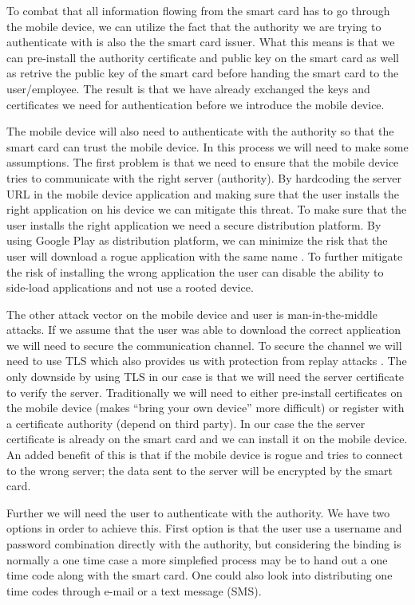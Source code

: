 To combat that all information flowing from the smart card has to go through the mobile device, we can utilize the fact that the authority we are trying to authenticate with is also the the smart card issuer. What this means is that we can pre-install the authority certificate and public key on the smart card as well as retrive the public key of the smart card before handing the smart card to the user/employee. The result is that we have already exchanged the keys and certificates we need for authentication before we introduce the mobile device.

The mobile device will also need to authenticate with the authority so that the smart card can trust the mobile device. In this process we will need to make some assumptions. The first problem is that we need to  ensure that the mobile device tries to communicate with the right server (authority). By hardcoding the server URL in the mobile device application and making sure that the user installs the right application on his device we can mitigate this threat. To make sure that the user installs the right application we need a secure distribution platform. By using Google Play as distribution platform, we can minimize the risk that the user will download a rogue application with the same name \cite{googlePlaySecureDist}. To further mitigate the risk of installing the wrong application the user can disable the ability to side-load applications and not use a rooted device.

The other attack vector on the mobile device and user is man-in-the-middle attacks. If we assume that the user was able to download the correct application we will need to secure the communication channel. To secure the channel we will need to use TLS \cite{rfc793} which also provides us with protection from replay attacks \cite{tlsOWASP}. The only downside by using TLS in our case is that we will need the server certificate to verify the server. Traditionally we will need to either pre-install certificates on the mobile device (makes ``bring your own device'' more difficult) or register with a certificate authority (depend on third party). In our case the the server certificate is already on the smart card and we can install it on the mobile device. An added benefit of this is that if the mobile device is rogue and tries to connect to the wrong server; the data sent to the server will be encrypted by the smart card.

Further we will need the user to authenticate with the authority. We have two options in order to achieve this. First option is that the user use a username and password combination directly with the authority, but considering the binding is normally a one time case a more simplefied process may be to hand out a one time code along with the smart card. One could also look into distributing one time codes through e-mail or a text message (SMS).


